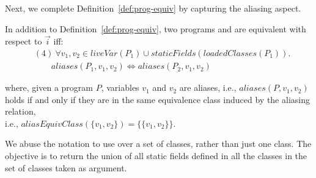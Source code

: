 \documentclass[sigconf,review,anonymous]{acmart}
\begin{document}
Next, we complete Definition~\ref{def:prog-equiv} by capturing the aliasing aspect.

\begin{definition}\label{def:prog-equiv-add}
   In addition to Definition~\ref{def:prog-equiv},
  two programs  and  are equivalent
  with respect to $\vec{i}$ iff:
\[
    \begin{aligned}
      & (4)~ \forall v_1,v_2 \in \mathit{liveVar}(P_1) \cup \mathit{staticFields}(loadedClasses(P_1)). \\
      & \qquad aliases(P_1, v_1, v_2) \Longleftrightarrow  aliases(P_2, v_1,v_2)      
    \end{aligned}
    \]
   
  \end{definition}

where, given a program $P$, variables $v_1$ and $v_2$ are aliases, i.e., $aliases(P, v_1, v_2)$ holds
if and only if they are in the same equivalence class induced by the aliasing relation,\\
  i.e., $aliasEquivClass(\{v_1,v_2\}) = \{\{v_1,v_2\}\}$.

  We abuse the notation to use  over a set of classes, rather than just one class.
  The objective is to return the union of all static fields defined in all the classes in the set of classes taken as argument.





\end{document}
